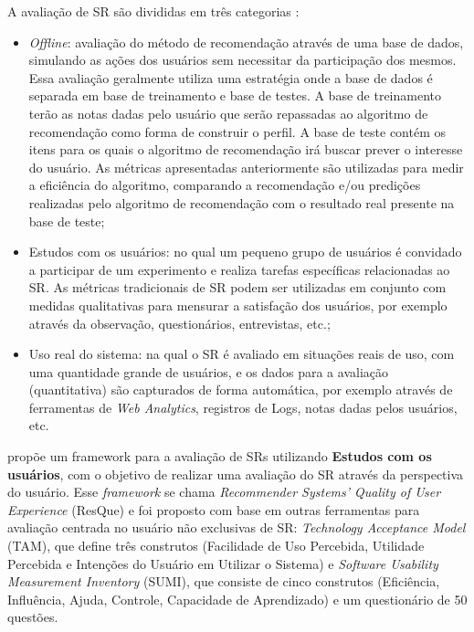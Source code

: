 A avaliação de SR são divididas em três categorias \cite{shani2011evaluating}:

\begin{itemize}
\item \textit{Offline}: avaliação do método de recomendação através de uma base de dados, simulando as ações
dos usuários sem necessitar da participação dos mesmos. Essa avaliação geralmente utiliza uma estratégia onde a base de dados
é separada em base de treinamento e base de testes. A base de treinamento terão as notas dadas pelo usuário que serão
repassadas ao algoritmo de recomendação como forma de construir o perfil. A base de teste contém os itens para os
quais o algoritmo de recomendação irá buscar prever o interesse do usuário. As métricas apresentadas anteriormente são
utilizadas para medir a eficiência do algoritmo, comparando a recomendação e/ou predições realizadas pelo algoritmo de
recomendação com o resultado real presente na base de teste;
\item Estudos com os usuários: no qual um pequeno grupo de usuários é convidado a participar de um experimento e realiza
tarefas específicas relacionadas ao SR. As métricas tradicionais de SR podem ser utilizadas em conjunto com medidas
qualitativas para mensurar a satisfação dos usuários, por exemplo através da observação, questionários, entrevistas, etc.;
\item Uso real do sistema: na qual o SR é avaliado em situações reais de uso, com uma quantidade grande de usuários, e
os dados para a avaliação (quantitativa) são capturados de forma automática, por exemplo através de ferramentas de
\textit{Web Analytics}, registros de Logs, notas dadas pelos usuários, etc.
\end{itemize}

 propõe um framework para a avaliação de SRs utilizando \textbf{Estudos com os usuários}, com o objetivo
de realizar uma avaliação do SR através da perspectiva do usuário. Esse \textit{framework} se chama \textit{Recommender
Systems' Quality of User Experience}  (ResQue) e foi proposto com base em outras ferramentas para avaliação centrada no
usuário não exclusivas de SR: \textit{Technology Acceptance Model} (TAM), que define três construtos (Facilidade de Uso
Percebida, Utilidade Percebida e Intenções do Usuário em Utilizar o Sistema) e \textit{Software Usability Measurement
Inventory} (SUMI), que consiste de cinco construtos (Eficiência, Influência, Ajuda, Controle, Capacidade de Aprendizado)
e um questionário de 50 questões.

